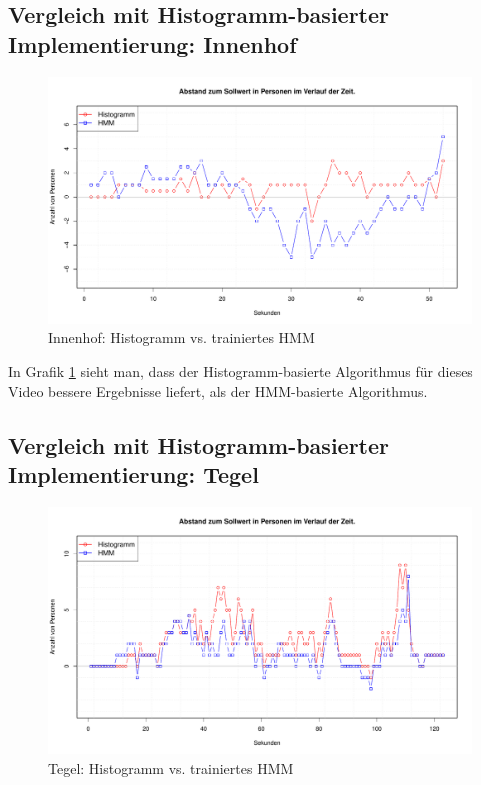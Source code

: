 \subsection{Vergleich mit Histogramm-basierter Implementierung: Innenhof}
\label{sec:eval_innenhof}
\begin{figure}
	\centering
\includegraphics[width=1\textwidth]{bilder/innenhof_910-1000_histo_vs_hmm_prelearned.pdf}
\caption{Innenhof: Histogramm vs. trainiertes HMM}
	\label{fig:Innenhof}
\end{figure}
In Grafik \ref{fig:Innenhof} sieht man, dass der Histogramm-basierte Algorithmus für dieses Video bessere Ergebnisse liefert, als der HMM-basierte Algorithmus.\\

\subsection{Vergleich mit Histogramm-basierter Implementierung: Tegel}
\label{sec:eval:tegel}
\begin{figure}
	\centering
\includegraphics[width=1\textwidth]{bilder/tegel_7-55_histo_vs_prelearned_hmm.pdf}
	\caption{Tegel: Histogramm vs. trainiertes HMM}
	\label{fig:tegel}
\end{figure}

